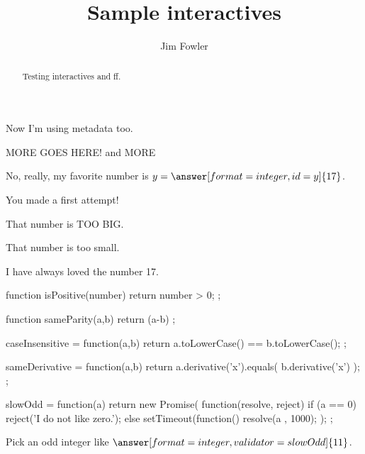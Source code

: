 \documentclass{ximera}
\title{Sample interactives}
\author{Jim Fowler}
\begin{document}
\begin{abstract}
Testing interactives and ff.
\end{abstract}
\maketitle

Now I'm using metadata too.

MORE GOES HERE!
and MORE

\begin{problem}
  No, really, my favorite number is $y = \answer[format=integer,id=y]{17}$.

  \begin{feedback}[attempt]
    You made a first attempt!
  \end{feedback}

  \begin{feedback}[y>17]
    That number is TOO BIG.
  \end{feedback}

  \begin{feedback}[y<17]
    That number is too small.
  \end{feedback}

  \begin{feedback}[correct]
    I have always loved the number 17.
  \end{feedback}
\end{problem}

\begin{javascript}
  function isPositive(number) {
    return number > 0;
  };

  function sameParity(a,b) {
    return (a-b)%
  };

  caseInsensitive = function(a,b) {
    return a.toLowerCase() == b.toLowerCase();
  };

  sameDerivative = function(a,b) {
    return a.derivative('x').equals( b.derivative('x') );
  };

  slowOdd = function(a) {
    return new Promise( function(resolve, reject) {
      if (a == 0)
        reject('I do not like zero.');
      else
        setTimeout(function(){
          resolve(a %
        }, 1000);      
    });
  };  
\end{javascript}

\begin{problem}
  Pick an odd integer like $\answer[format=integer,validator=slowOdd]{11}$.
\end{problem}
\end{document}
